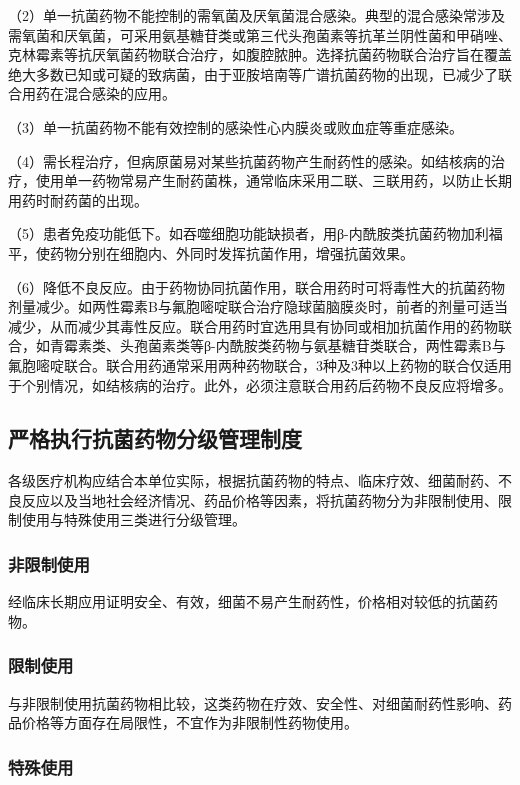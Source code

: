 （2）单一抗菌药物不能控制的需氧菌及厌氧菌混合感染。典型的混合感染常涉及需氧菌和厌氧菌，可采用氨基糖苷类或第三代头孢菌素等抗革兰阴性菌和甲硝唑、克林霉素等抗厌氧菌药物联合治疗，如腹腔脓肿。选择抗菌药物联合治疗旨在覆盖绝大多数已知或可疑的致病菌，由于亚胺培南等广谱抗菌药物的出现，已减少了联合用药在混合感染的应用。

（3）单一抗菌药物不能有效控制的感染性心内膜炎或败血症等重症感染。

（4）需长程治疗，但病原菌易对某些抗菌药物产生耐药性的感染。如结核病的治疗，使用单一药物常易产生耐药菌株，通常临床采用二联、三联用药，以防止长期用药时耐药菌的出现。

（5）患者免疫功能低下。如吞噬细胞功能缺损者，用β-内酰胺类抗菌药物加利福平，使药物分别在细胞内、外同时发挥抗菌作用，增强抗菌效果。

（6）降低不良反应。由于药物协同抗菌作用，联合用药时可将毒性大的抗菌药物剂量减少。如两性霉素B与氟胞嘧啶联合治疗隐球菌脑膜炎时，前者的剂量可适当减少，从而减少其毒性反应。联合用药时宜选用具有协同或相加抗菌作用的药物联合，如青霉素类、头孢菌素类等β-内酰胺类药物与氨基糖苷类联合，两性霉素B与氟胞嘧啶联合。联合用药通常采用两种药物联合，3种及3种以上药物的联合仅适用于个别情况，如结核病的治疗。此外，必须注意联合用药后药物不良反应将增多。

\subsection{严格执行抗菌药物分级管理制度}

各级医疗机构应结合本单位实际，根据抗菌药物的特点、临床疗效、细菌耐药、不良反应以及当地社会经济情况、药品价格等因素，将抗菌药物分为非限制使用、限制使用与特殊使用三类进行分级管理。

\subsubsection{非限制使用}

经临床长期应用证明安全、有效，细菌不易产生耐药性，价格相对较低的抗菌药物。

\subsubsection{限制使用}

与非限制使用抗菌药物相比较，这类药物在疗效、安全性、对细菌耐药性影响、药品价格等方面存在局限性，不宜作为非限制性药物使用。

\subsubsection{特殊使用}

